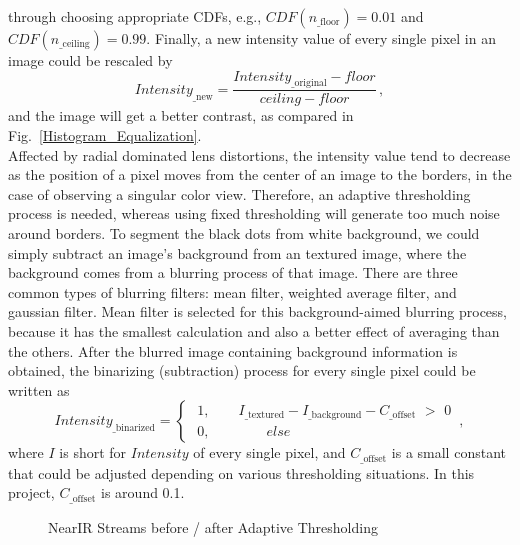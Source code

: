 through choosing appropriate CDFs, e.g., \(CDF(n_{\text{\_floor}}) = 0.01\) and \(CDF(n_{\text{\_ceiling}}) = 0.99\). Finally, a new intensity value of every single pixel in an image could be rescaled by
%
\begin{equation}
Intensity_{\text{\_new}} = \frac{Intensity_{\text{\_original}} - floor}{ceiling - floor} \, ,
\end{equation}%
%
\noindent
and the image will get a better contrast, as compared in Fig.~\ref{Histogram_Equalization}.%
\\\indent%
Affected by radial dominated lens distortions, the intensity value tend to decrease as the position of a pixel moves from the center of an image to the borders, in the case of observing a singular color view. Therefore, an adaptive thresholding process is needed, whereas using fixed thresholding will generate too much noise around borders. To segment the black dots from white background, we could simply subtract an image's background from an textured image, where the background comes from a blurring process of that image.%
%
There are three common types of blurring filters: mean filter, weighted average filter, and gaussian filter. Mean filter is selected for this background-aimed blurring process, because it has the smallest calculation and also a better effect of averaging than the others. After the blurred image containing background information is obtained, the binarizing (subtraction) process for every single pixel could be written as
%
\begin{equation}
%
Intensity_{\text{\_binarized}} = %
%
\begin{cases}
\,\, 1 , \quad \quad I_{\text{\_textured}} - I_{\text{\_background}}  -  C_{\text{\_offset}} \,\, > \,\,0 %
\\%
\,\, 0 , \quad \quad \quad \quad else%
\end{cases}
 \, ,%
\end{equation}%
%
where \(I\) is short for \(Intensity\) of every single pixel, and \(C_{\text{\_offset}}\) is a small constant that could be adjusted depending on various thresholding situations. In this project, \(C_{\text{\_offset}}\) is around 0.1.%
%
\begin{figure}[t]
\hspace*{-0.5cm}
\centering
{}
\caption{\gls{NearIR} Streams before / after Adaptive Thresholding}
\label{Adaptive_Thresholding}
\end{figure}%
